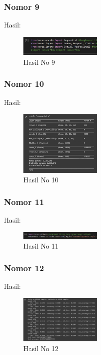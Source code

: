 \begin{enumerate}
\subsubsection{Nomor 9}
\hfill\break

Hasil:
\begin{figure}[H]
\centering
	\includegraphics[width=4cm]{figures/1174075/7/no9.jpg}
	\caption{Hasil No 9}
\end{figure}

\subsubsection{Nomor 10}
\hfill\break

Hasil:
\begin{figure}[H]
\centering
	\includegraphics[width=4cm]{figures/1174075/7/no10.jpg}
	\caption{Hasil No 10}
\end{figure}

\subsubsection{Nomor 11}
\hfill\break

Hasil:
\begin{figure}[H]
\centering
	\includegraphics[width=4cm]{figures/1174075/7/no11.jpg}
	\caption{Hasil No 11}
\end{figure}

\subsubsection{Nomor 12}
\hfill\break

Hasil:
\begin{figure}[H]
\centering
	\includegraphics[width=4cm]{figures/1174075/7/no12.jpg}
	\caption{Hasil No 12}
\end{figure}


\end{enumerate}
